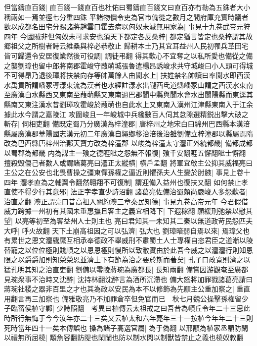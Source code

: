 但當鑄直百錢|{
	直百錢一錢直百也杜佑曰蜀鑄直百錢文曰直百亦冇勒為五銖者大小稱兩如一焉並徑七分重四銖}
平諸物價令吏為官市備從之數月之間府庫充實時議者欲以成都名田宅分賜諸將趙雲曰霍去病以匈奴未滅無用家為|{
	事見十九卷武帝元狩四年}
今國賊非但匈奴未可求安也須天下都定各反桑梓|{
	都定猶言皆定也桑梓謂其故郷祖父之所樹者詩云維桑與梓必恭敬止}
歸耕本土乃其宜耳益州人民初罹兵革田宅皆可歸還令安居復業然後可役調|{
	調徒弔翻}
得其歡心不宜奪之以私所愛也備從之備之襲劉璋也留中郎將南郡霍峻守葭萌城張魯遣楊昂誘峻求共守城峻曰小人頭可得城不可得昂乃退後璋將扶禁向存等帥萬餘人由閬水上|{
	扶姓禁名帥讀曰率閬水即西漢水禹貢所謂嶓冢導漾東流為漢者也水經註漾水出隴西氐道縣嶓冢山謂之西漢水東南至廣漢白水縣西又東南至葭萌縣又東南過巴郡閬中縣與閬水會水出閬陽縣而東逕其縣南又東注漢水昔劉璋攻霍峻於葭萌也自此水上又東南入漢州江津縣東南入于江余據此水今謂之嘉陵江}
攻圍峻且一年峻城中兵纔數百人伺其怠隙選精鋭出擊大破之斬存|{
	伺相吏翻}
備既定蜀乃分廣漢為梓潼郡|{
	唐梓州之地宋白曰綿州巴西縣本漢涪縣屬廣漢郡華陽國志漢元初二年廣漢自繩鄉移治涪後治雒劉備立梓潼郡以縣屬焉隋改為巴西縣唐梓州治郪天寶方改為梓潼郡}
以峻為梓潼太守灋正外統都畿|{
	備都成都以蜀郡為都畿}
内為謀主一飱之德睚眦之怨無不報復|{
	飱千安翻睚五懈翻眦士懈翻}
擅殺毁傷己者數人或謂諸葛亮曰灋正太縱横|{
	横戶孟翻}
將軍宜啟主公抑其威福亮曰主公之在公安也北畏曹操之彊東憚孫權之逼近則懼孫夫人生變於肘腋|{
	事見上卷十四年}
灋孝直為之輔翼令翻然翱翔不可復制|{
	謂迎備入益州也復扶又翻}
如何禁止孝直使不得少行其意邪|{
	法正字孝直少詩沼翻}
諸葛亮佐備治蜀頗尚嚴峻人多怨歎者|{
	治直之翻}
灋正謂亮曰昔高祖入關約灋三章秦民知德|{
	事見九卷高帝元年}
今君假借威力跨據一州初有其國未垂惠撫且客主之義宜相降下|{
	下遐稼翻}
願緩刑弛禁以慰其望|{
	以亮等初至為客益州人士則主也}
亮曰君知其一未知其二秦以無道政苛民怨匹夫大呼|{
	呼火故翻}
天下土崩高祖因之可以弘濟|{
	弘大也}
劉璋暗弱自焉以來|{
	焉璋父也}
有累世之恩文灋覊縻互相承奉德政不舉威刑不肅蜀土人士專權自恣君臣之道漸以陵替寵之以位位極則賤順之以恩恩極則慢所以致敝實由於此吾今威之以灋灋行則知恩限之以爵爵加則知榮榮恩並濟上下有節為治之要於斯而著矣|{
	孔子曰政寬則濟之以猛孔明其知之治直吏翻}
劉備以零陵蔣琬為廣都長|{
	長知兩翻}
備嘗因游觀奄至廣都見琬衆事不治時又沈醉|{
	沈持林翻沈醉言為酒所沉滯也}
備大怒將加罪戮諸葛亮請曰蔣琬社稷之器非百里之才也其為政以安民為本不以修飾為先願主公重加察之|{
	重直用翻言再三加察也}
備雅敬亮乃不加罪倉卒但免官而已　秋七月魏公操擊孫權留少子臨菑侯植守鄴|{
	少詩照翻　考異曰植傳云太祖戒之曰吾昔為頓丘令年二十三思此時所行無悔于今今汝年亦二十三矣又云植太和六年薨年三十一按植今年年二十三則死時當年四十一矣本傳誤也}
操為諸子高選官屬|{
	為于偽翻}
以邢顒為植家丞顒防閑以禮無所屈橈|{
	顒魚容翻防隄也閑闌也防以制水閑以制獸皆禁止之義也橈奴教翻}
